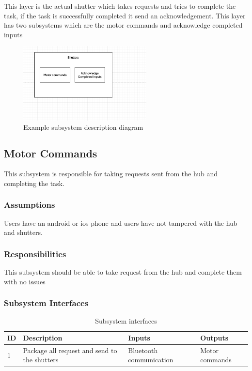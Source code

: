 This layer is the actual shutter which takes requests and tries to complete the task, if the task is successfully completed it send an acknowledgement. This layer has two subsystems which are the motor commands and acknowledge completed inputs

\begin{figure}[h!]
	\centering
 	\includegraphics[width=0.60\textwidth]{images/Shutters}
 \caption{Example subsystem description diagram}
\end{figure}

\subsection{Motor Commands}
This subsystem is responsible for taking requests sent from the hub and completing the task.

\subsubsection{Assumptions}
Users have an android or ios phone and users have not tampered with the hub and shutters.

\subsubsection{Responsibilities}
This subsystem should be able to take request from the hub and complete them with no issues

\subsubsection{Subsystem Interfaces}


\begin {table}[H]
\caption {Subsystem interfaces} 
\begin{center}
    \begin{tabular}{ | p{1cm} | p{7cm} | p{5cm} | p{3cm} |}
    \hline
    ID & Description & Inputs & Outputs \\ \hline
    1 & Package all request and send to the shutters & Bluetooth communication & Motor commands\\ \hline
    \end{tabular}
\end{center}
\end{table}


